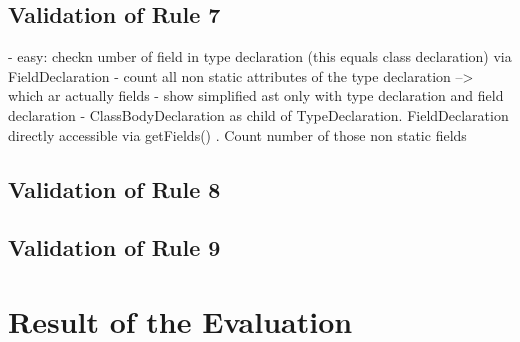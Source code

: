 


\subsection*{Validation of Rule 7}
 - easy: checkn umber of field in type declaration (this equals class declaration) via FieldDeclaration
 - count all non static attributes of the type declaration --> which ar actually fields
  - show simplified ast only with type declaration and field declaration
  - ClassBodyDeclaration as child of TypeDeclaration. FieldDeclaration directly accessible via getFields() . Count number of those non static fields




\subsection*{Validation of Rule 8}




\subsection*{Validation of Rule 9}
\section{Result of the Evaluation}
\label{e:result}
